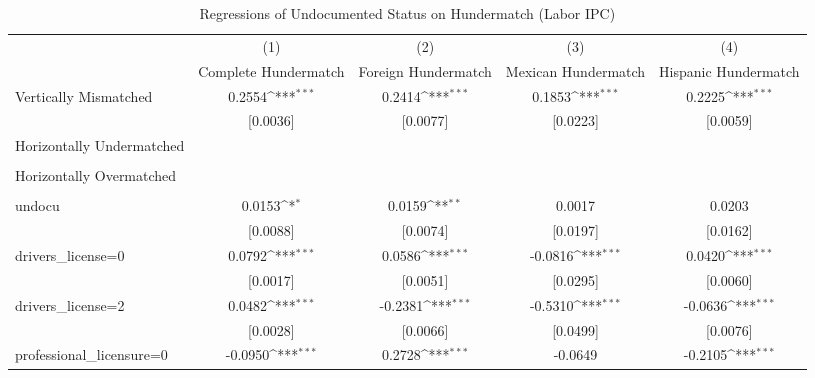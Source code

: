 \begin{table}[htbp]\centering
\def\sym#1{\ifmmode^{#1}\else\(^{#1}\)\fi}
\caption{Regressions of Undocumented Status on Hundermatch (Labor IPC)}
\begin{tabular}{l*{4}{c}}
\toprule
                    &\multicolumn{1}{c}{(1)}         &\multicolumn{1}{c}{(2)}         &\multicolumn{1}{c}{(3)}         &\multicolumn{1}{c}{(4)}         \\
                    &Complete Hundermatch         &Foreign Hundermatch         &Mexican Hundermatch         &Hispanic Hundermatch         \\
\midrule
Vertically Mismatched&      0.2554\sym{***}&      0.2414\sym{***}&      0.1853\sym{***}&      0.2225\sym{***}\\
                    &    [0.0036]         &    [0.0077]         &    [0.0223]         &    [0.0059]         \\
\addlinespace
Horizontally Undermatched&                     &                     &                     &                     \\
                    &                     &                     &                     &                     \\
\addlinespace
Horizontally Overmatched&                     &                     &                     &                     \\
                    &                     &                     &                     &                     \\
\addlinespace
undocu              &      0.0153\sym{*}  &      0.0159\sym{**} &      0.0017         &      0.0203         \\
                    &    [0.0088]         &    [0.0074]         &    [0.0197]         &    [0.0162]         \\
\addlinespace
drivers\_license=0   &      0.0792\sym{***}&      0.0586\sym{***}&     -0.0816\sym{***}&      0.0420\sym{***}\\
                    &    [0.0017]         &    [0.0051]         &    [0.0295]         &    [0.0060]         \\
\addlinespace
drivers\_license=2   &      0.0482\sym{***}&     -0.2381\sym{***}&     -0.5310\sym{***}&     -0.0636\sym{***}\\
                    &    [0.0028]         &    [0.0066]         &    [0.0499]         &    [0.0076]         \\
\addlinespace
professional\_licensure=0&     -0.0950\sym{***}&      0.2728\sym{***}&     -0.0649         &     -0.2105\sym{***}\\

\end{tabular}
\end{table}
